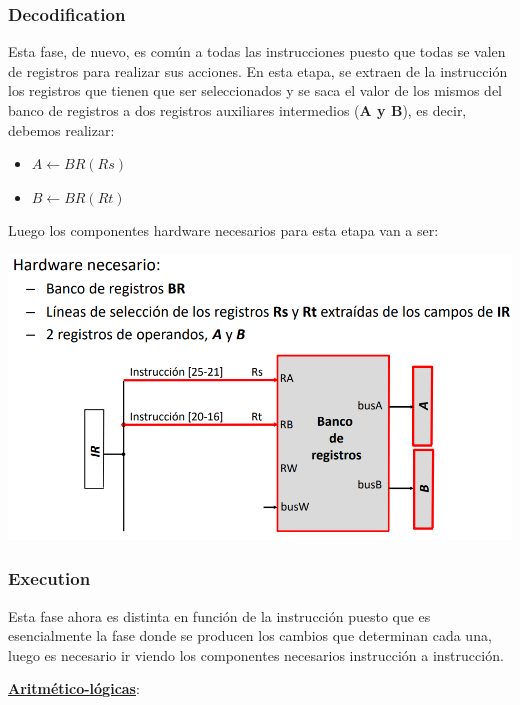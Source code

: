 \documentclass[a4paper,10pt]{book}
\begin{document}
\subsubsection*{Decodification}
Esta fase, de nuevo, es común a todas las instrucciones puesto que todas se valen de registros para realizar sus acciones. En esta etapa, se extraen de la instrucción los registros que tienen que ser seleccionados y se saca el valor de los mismos del banco de registros a dos registros auxiliares intermedios (\textbf{A y B}), es decir, debemos realizar:
\begin{itemize}
\item $A\leftarrow BR(Rs)$
\item $B\leftarrow BR(Rt)$
\end{itemize}
Luego los componentes hardware necesarios para esta etapa van a ser:
\begin{center}
\includegraphics[scale=0.5]{fase deco}
\end{center}

\subsubsection*{Execution}
Esta fase ahora es distinta en función de la instrucción puesto que es esencialmente la fase donde se producen los cambios que determinan cada una, luego es necesario ir viendo los componentes necesarios instrucción a instrucción.

\underline{\textbf{Aritmético-lógicas}}:
\end{document}
